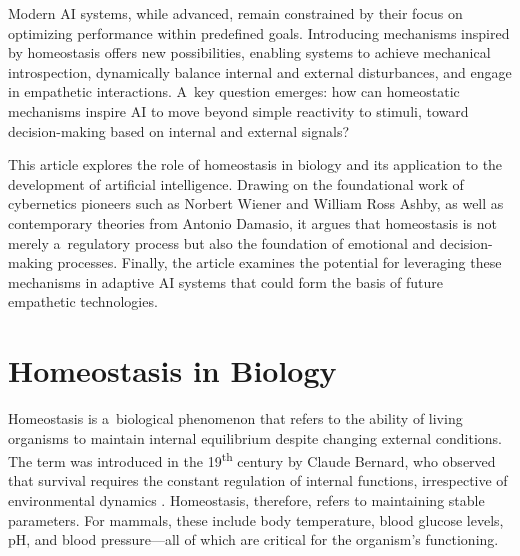 Modern AI systems, while advanced, remain constrained by their focus on optimizing performance within predefined goals. Introducing mechanisms inspired by homeostasis offers new possibilities, enabling systems to achieve mechanical introspection, dynamically balance internal and external disturbances, and engage in empathetic interactions. A~key question emerges: how can homeostatic mechanisms inspire AI to move beyond simple reactivity to stimuli, toward decision-making based on internal and external signals?



This article explores the role of homeostasis in biology and its application to the development of artificial intelligence. Drawing on the foundational work of cybernetics pioneers such as Norbert Wiener and William Ross Ashby, as well as contemporary theories from Antonio Damasio, it argues that homeostasis is not merely a~regulatory process but also the foundation of emotional and decision-making processes. Finally, the article examines the potential for leveraging these mechanisms in adaptive AI systems that could form the basis of future empathetic technologies.



\section*{Homeostasis in Biology~}

Homeostasis is a~biological phenomenon that refers to the ability of living organisms to maintain internal equilibrium despite changing external conditions. The term was introduced in the 19\textsuperscript{th} century by Claude Bernard, who observed that survival requires the constant regulation of internal functions, irrespective of environmental dynamics 
\parencite[][]{fleming_walter_1984}. %
 Homeostasis, therefore, refers to maintaining stable parameters. For mammals, these include body temperature, blood glucose levels, pH, and blood pressure---all of which are critical for the organism's functioning.~



